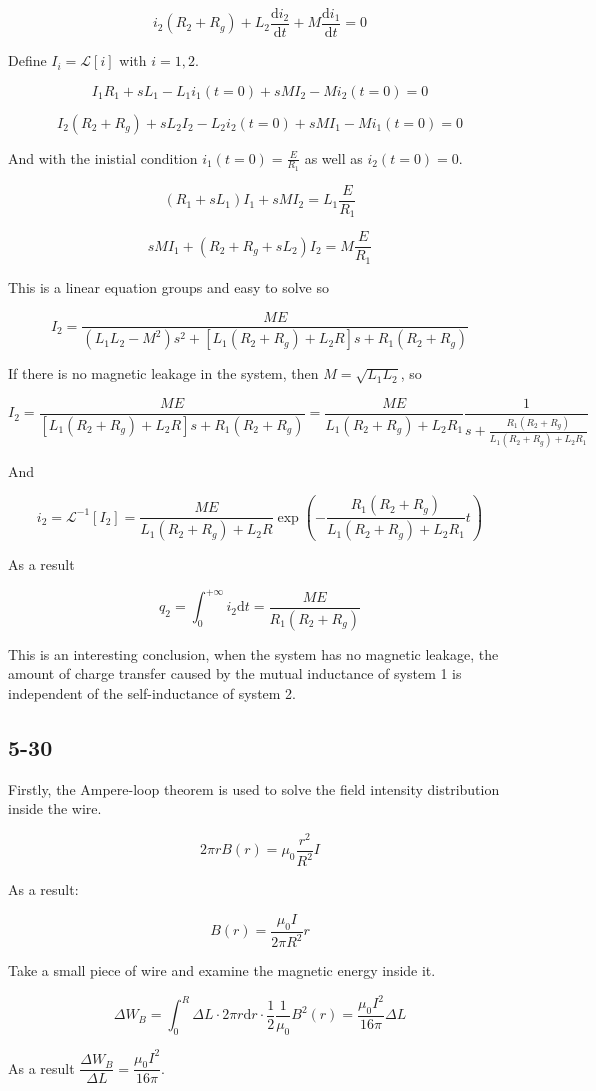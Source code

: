 \documentclass[a4paper,11pt]{amsart}
\theoremstyle{definition}
\begin{document}
	$$
	i_2\left( R_2+R_g \right) +L_2\frac{\mathrm{d}i_2}{\mathrm{d}t}+M\frac{\mathrm{d}i_1}{\mathrm{d}t}=0
	$$
	
	Define $I_i=\mathscr{L}[i]$ with $i=1,2$.
	
	$$
	I_1R_1+sL_1-L_1i_1\left( t=0 \right) +sMI_2-Mi_2\left( t=0 \right) =0
	$$
	
	$$
	I_2\left( R_2+R_g \right) +sL_2I_2-L_2i_2\left( t=0 \right) +sMI_1-Mi_1\left( t=0 \right) =0
	$$
	
	And with the inistial condition $\displaystyle i_1\left( t=0 \right) =\frac{E}{R_1}$ as well as $\displaystyle i_2\left( t=0 \right) =0$.

	$$
	\left( R_1+sL_1 \right) I_1+sMI_2=L_1\frac{E}{R_1}
	$$
	
	$$
	sMI_1+\left( R_2+R_g+sL_2 \right) I_2=M\frac{E}{R_1}
	$$
	
	This is a linear equation groups and easy to solve so
	
	$$
	I_2=\frac{ME}{\left( L_1L_2-M^2 \right) s^2+\left[ L_1\left( R_2+R_g \right) +L_2R \right] s+R_1\left( R_2+R_g \right)}
	$$
	
	If there is no magnetic leakage in the system, then $\displaystyle M=\sqrt{L_1L_2}$, so
	
	$$
	I_2=\frac{ME}{\left[ L_1\left( R_2+R_g \right) +L_2R \right] s+R_1\left( R_2+R_g \right)}=\frac{ME}{L_1\left( R_2+R_g \right) +L_2R_1}\frac{1}{s+\frac{R_1\left( R_2+R_g \right)}{L_1\left( R_2+R_g \right) +L_2R_1}}
	$$
	
	And 
	
	$$
	i_2=\mathscr{L}^{-1}[I_2]=\frac{ME}{L_1\left( R_2+R_g \right) +L_2R}\exp \left( -\frac{R_1\left( R_2+R_g \right)}{L_1\left( R_2+R_g \right) +L_2R_1}t \right) 
	$$
	
	As a result
	
	$$
	q_2=\int_0^{+\infty}{i_2\mathrm{d}t}=\frac{ME}{R_1\left( R_2+R_g \right)}
	$$
	
	This is an interesting conclusion, when the system has no magnetic leakage, the amount of charge transfer caused by the mutual inductance of system 1 is independent of the self-inductance of system 2.
	
	\subsection*{5-30}
	
	Firstly, the Ampere-loop theorem is used to solve the field intensity distribution inside the wire.
	
	$$
	2\pi rB(r)=\mu_0\dfrac{r^2}{R^2}I
	$$
	
	As a result:
	
	$$
	B(r)=\dfrac{\mu_0I}{2\pi R^2}r
	$$
	
	Take a small piece of wire and examine the magnetic energy inside it.
	
	$$
	\Delta W_B=\int_0^R{\Delta L\cdot 2\pi r\mathrm{d}r\cdot \frac{1}{2}\frac{1}{\mu _0}B^2\left( r \right)}=\dfrac{\mu_0I^2}{16\pi }\Delta L
	$$
	
	As a result $\displaystyle \dfrac{\Delta W_B}{\Delta L}=\dfrac{\mu_0I^2}{16\pi }$.
\end{document}
